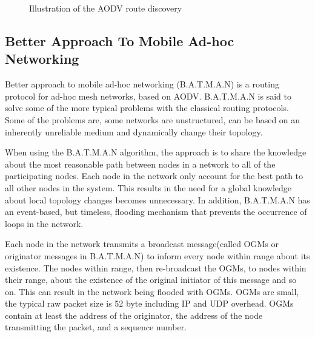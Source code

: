 \begin{figure}[!h]
	\centering
	\caption{Illustration of the AODV route discovery}
	\label{fig:AODVfigure}
\end{figure}

\subsection{Better Approach To Mobile Ad-hoc Networking}
Better approach to mobile ad-hoc networking (B.A.T.M.A.N) is a routing protocol for ad-hoc mesh networks, based on AODV. 
B.A.T.M.A.N is said to solve some of the more typical problems with the classical routing protocols.
Some of the problems are, some networks are unstructured, can be based on an inherently unreliable medium and dynamically change their topology\cite{BATMAN}.

When using the B.A.T.M.A.N algorithm, the approach is to share the knowledge about the most reasonable path between nodes in a network to all of the participating nodes.
Each node in the network only account for the best path to all other nodes in the system.
This results in the need for a global knowledge about local topology changes becomes unnecessary.
In addition, B.A.T.M.A.N has an event-based, but timeless, flooding mechanism that prevents the occurrence of loops in the network.

Each node in the network transmits a broadcast message(called OGMs or originator messages in B.A.T.M.A.N) to inform every node within range about its existence.
The nodes within range, then re-broadcast the OGMs, to nodes within their range, about the existence of the original initiator of this message and so on.
This can result in the network being flooded with OGMs.
OGMs are small, the typical raw packet size is 52 byte including IP and UDP overhead\cite{BATMAN}.
OGMs contain at least the address of the originator, the address of the node transmitting the packet, and a sequence number.

